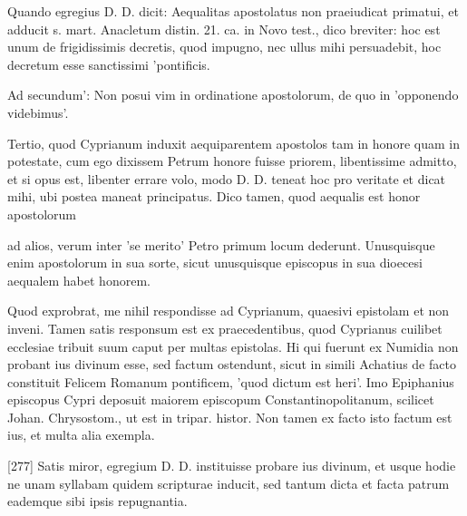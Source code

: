 Quando egregius D. D. dicit: Aequalitas apostolatus non praeiudicat primatui, et adducit s. mart. Anacletum distin. 21. ca. in Novo test., dico breviter: hoc est unum de frigidissimis decretis, quod impugno, nec ullus mihi persuadebit, hoc decretum esse sanctissimi 'pontificis.

Ad secundum': Non posui vim in ordinatione apostolorum, de quo in 'opponendo videbimus'.

Tertio, quod Cyprianum induxit aequiparentem apostolos tam in honore quam in potestate, cum ego dixissem Petrum honore fuisse priorem, libentissime admitto, et si opus est, libenter errare volo, modo D. D. teneat hoc pro veritate et dicat mihi, ubi postea maneat principatus. Dico tamen, quod aequalis est honor apostolorum

ad alios, verum inter 'se merito' Petro primum locum dederunt. Unusquisque enim apostolorum in sua sorte, sicut unusquisque episcopus in sua dioecesi aequalem habet honorem.

Quod exprobrat, me nihil respondisse ad Cyprianum, quaesivi epistolam et non inveni. Tamen satis responsum est ex praecedentibus, quod Cyprianus cuilibet ecclesiae tribuit suum caput per multas epistolas. Hi qui fuerunt ex Numidia non probant ius divinum esse, sed factum ostendunt, sicut in simili Achatius de facto constituit Felicem Romanum pontificem, 'quod dictum est heri'. Imo Epiphanius episcopus Cypri deposuit maiorem episcopum Constantinopolitanum, scilicet Johan. Chrysostom., ut est in tripar. histor. Non tamen ex facto isto factum est ius, et multa alia exempla.

[277] Satis miror, egregium D. D. instituisse probare ius divinum, et usque hodie ne unam syllabam quidem scripturae inducit, sed tantum dicta et facta patrum eademque sibi ipsis repugnantia.

